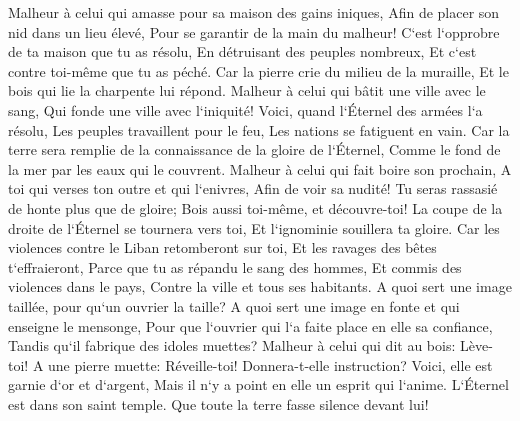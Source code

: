 \verse Malheur à celui qui amasse pour sa maison des gains iniques, Afin de placer son nid dans un lieu élevé, Pour se garantir de la main du malheur! 
\verse C`est l`opprobre de ta maison que tu as résolu, En détruisant des peuples nombreux, Et c`est contre toi-même que tu as péché. 
\verse Car la pierre crie du milieu de la muraille, Et le bois qui lie la charpente lui répond. 
\verse Malheur à celui qui bâtit une ville avec le sang, Qui fonde une ville avec l`iniquité! 
\verse Voici, quand l`Éternel des armées l`a résolu, Les peuples travaillent pour le feu, Les nations se fatiguent en vain. 
\verse Car la terre sera remplie de la connaissance de la gloire de l`Éternel, Comme le fond de la mer par les eaux qui le couvrent. 
\verse Malheur à celui qui fait boire son prochain, A toi qui verses ton outre et qui l`enivres, Afin de voir sa nudité! 
\verse Tu seras rassasié de honte plus que de gloire; Bois aussi toi-même, et découvre-toi! La coupe de la droite de l`Éternel se tournera vers toi, Et l`ignominie souillera ta gloire. 
\verse Car les violences contre le Liban retomberont sur toi, Et les ravages des bêtes t`effraieront, Parce que tu as répandu le sang des hommes, Et commis des violences dans le pays, Contre la ville et tous ses habitants. 
\verse A quoi sert une image taillée, pour qu`un ouvrier la taille? A quoi sert une image en fonte et qui enseigne le mensonge, Pour que l`ouvrier qui l`a faite place en elle sa confiance, Tandis qu`il fabrique des idoles muettes? 
\verse Malheur à celui qui dit au bois: Lève-toi! A une pierre muette: Réveille-toi! Donnera-t-elle instruction? Voici, elle est garnie d`or et d`argent, Mais il n`y a point en elle un esprit qui l`anime. 
\verse L`Éternel est dans son saint temple. Que toute la terre fasse silence devant lui! 

